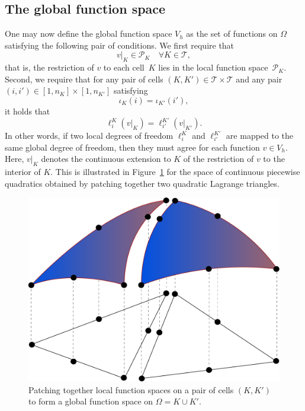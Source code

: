 \subsection{The global function space}

One may now define the global function space $V_h$ as the set of
functions on $\Omega$ satisfying the following pair of conditions. We
first require that
\begin{equation}
  v |_K \in \mathcal{P}_K \quad \forall K \in \mathcal{T},
\end{equation}
that is, the restriction of $v$ to each cell~$K$ lies in the local
function space~$\mathcal{P}_K$. Second, we require that for any pair
of cells $(K, K') \in \mathcal{T} \times \mathcal{T}$ and any
pair~$(i, i') \in [1,n_K] \times [1,n_{K'}]$ satisfying
\begin{equation}
  \iota_K(i) = \iota_{K'}(i'),
\end{equation}
it holds that
\begin{equation} \label{eq:constraint}
  \ell^K_i(v|_K) = \ell^{K'}_{i'}(v|_{K'}).
\end{equation}
In other words, if two local degrees of freedom $\ell^K_i$ and
$\ell^{K'}_{i'}$ are mapped to the same global degree of freedom, then
they must agree for each function $v \in V_h$. Here, $v|_K$ denotes
the continuous extension to $K$ of the restriction of $v$ to the
interior of $K$. This is illustrated in Figure~\ref{fig:femspace} for
the space of continuous piecewise quadratics obtained by patching
together two quadratic Lagrange triangles.

\begin{figure}
  \begin{center}
    \includegraphics[width=\largefig]{chapters/kirby-7/pdf/femspace.pdf}
    \caption{Patching together local function spaces on a pair of
    cells $(K, K')$ to form a global function space on $\Omega = K
    \cup K'$.}
    \label{fig:femspace}
  \end{center}
\end{figure}

